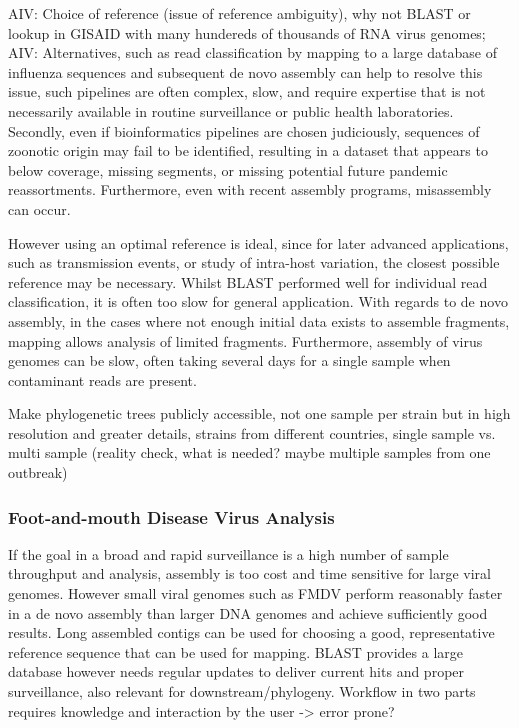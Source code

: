 AIV: Choice of reference (issue of reference ambiguity), why not BLAST or lookup in GISAID with many hundereds of thousands of RNA virus genomes; \\
AIV: Alternatives, such as read classification by mapping to a large database of influenza sequences and subsequent de novo assembly can help to resolve this issue, such pipelines are often complex, slow, and require expertise that is not necessarily available in routine
surveillance or public health laboratories. Secondly, even if bioinformatics pipelines are chosen judiciously, sequences of zoonotic origin may fail to be identified, resulting in a dataset that appears to below coverage, missing segments, or missing potential future pandemic reassortments. Furthermore, even with recent assembly programs, misassembly can occur.

However using an optimal reference is ideal, since for later advanced applications, such as transmission events, or study of intra-host variation, the closest possible reference may be necessary. Whilst BLAST performed well for individual read classification, it is often too slow for general application. With regards to de novo assembly, in the cases where not enough initial data exists to assemble fragments, mapping allows analysis of limited fragments. Furthermore, assembly of virus genomes can be slow, often taking several days for a single sample when contaminant reads are present.

Make phylogenetic trees publicly accessible, not one sample per strain but in high resolution and greater details, strains from different countries,
single sample vs. multi sample (reality check, what is needed? maybe multiple samples from one outbreak) 


\subsubsection*{Foot-and-mouth Disease Virus Analysis}
If the goal in a broad and rapid surveillance is a high number of sample throughput and analysis, assembly is too cost and time sensitive for large viral genomes. However small viral genomes such as FMDV perform reasonably faster in a de novo assembly than larger DNA genomes and achieve sufficiently good results. Long assembled contigs can be used for choosing a good, representative reference sequence that can be used for mapping. BLAST provides a large database however needs regular updates to deliver current hits and proper surveillance, also relevant for downstream/phylogeny.
Workflow in two parts requires knowledge and interaction by the user -> error prone?

